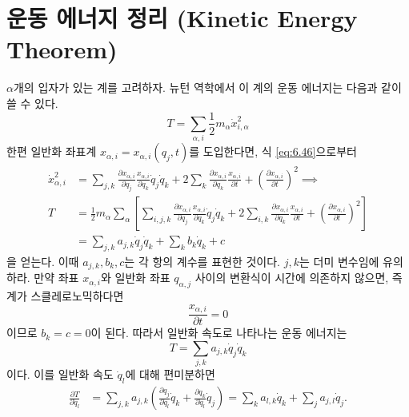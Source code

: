 \documentclass[chapter, oneside, b5paper]{oblivoir}
\theoremstyle{plain}
\theoremstyle{definition}
\theoremstyle{remark}
\begin{document}
\section{운동 에너지 정리 (Kinetic Energy Theorem)}
$\alpha$개의 입자가 있는 계를 고려하자. 뉴턴 역학에서 이 계의 운동 에너지는 다음과 같이 쓸 수 있다.
\begin{equation}
    T = \sum_{\alpha, i} \frac{1}{2}m_\alpha \dot{x}_{i, \alpha}^2
\end{equation}
한편 일반화 좌표계 $x_{\alpha, i} = x_{\alpha, i}(q_j, t)$를 도입한다면, 식 \ref{eq:6.46}으로부터
\begin{equation}
    \begin{aligned}
    \dot{x}_{\alpha, i}^2 &= \sum_{j, k} \frac{\partial x_{\alpha, i}}{\partial q_j} \frac{x_{\alpha, i}}{\partial q_k} \dot{q}_j \dot{q}_k + 2 \sum_{k} \frac{\partial x_{\alpha, i}}{\partial q_k} \frac{x_{\alpha, i}}{\partial t} + \left(\frac{\partial x_{\alpha, i}}{\partial t} \right)^2 \implies \\
    T &= \frac{1}{2}m_\alpha \sum_{\alpha} \left[ \sum_{i, j, k} \frac{\partial x_{\alpha, i}}{\partial q_j} \frac{x_{\alpha, i}}{\partial q_k} \dot{q}_j \dot{q}_k + 2 \sum_{i, k} \frac{\partial x_{\alpha, i}}{\partial q_k} \frac{x_{\alpha, i}}{\partial t} + \left(\frac{\partial x_{\alpha, i}}{\partial t} \right)^2 \right] \\
    &= \sum_{j, k} a_{j, k} \dot{q}_j \dot{q}_k + \sum_{k} b_k \dot{q}_k + c
    \end{aligned}
\end{equation}
을 얻는다. 이때 $a_{j, k}, b_{k}, c$는 각 항의 계수를 표현한 것이다. $j, k$는 더미 변수임에 유의하라. 만약 좌표 $x_{\alpha, i}$와 일반화 좌표 $q_{\alpha, j}$ 사이의 변환식이 시간에 의존하지 않으면, 즉 계가 스클레로노믹하다면
\begin{equation}
    \frac{x_{\alpha, i}}{\partial t} = 0
\end{equation}
이므로 $b_k = c = 0$이 된다. 따라서 일반화 속도로 나타나는 운동 에너지는
\begin{equation}
    T = \sum_{j, k} a_{j, k} \dot{q}_j \dot{q}_k
\end{equation}
이다. 이를 일반화 속도 $\dot{q}_l$에 대해 편미분하면
\begin{equation}
    \begin{aligned}
    \frac{\partial T}{\partial \dot{q}_l} &= \sum_{j, k} a_{j, k} \left( \frac{\partial q_j}{\partial \dot{q}_l} \dot{q}_k + \frac{\partial q_k}{\partial \dot{q}_l} \dot{q}_j \right) = \sum_k a_{l, k} \dot{q}_k + \sum_{j} a_{j, l} \dot{q}_j.
    \end{aligned}
\end{equation}
\end{document}
